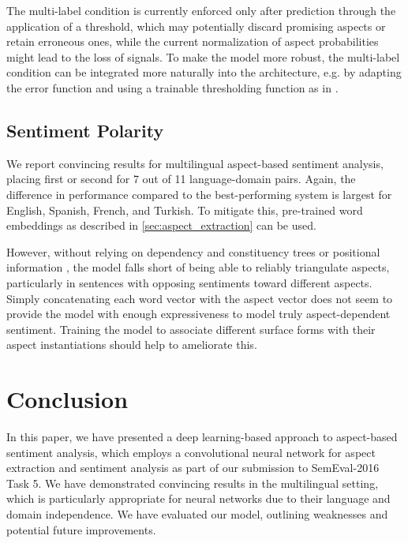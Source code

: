 \documentclass[11pt,letterpaper]{article}
\begin{document}
The multi-label condition is currently enforced only after prediction through the application of a threshold, which may potentially discard promising aspects or retain erroneous ones, while the current normalization of aspect probabilities might lead to the loss of signals. To make the model more robust, the multi-label condition can be integrated more naturally into the architecture, e.g. by adapting the error function and using a trainable thresholding function as in \cite{Zhang2006}.

\subsection{Sentiment Polarity}

We report convincing results for multilingual aspect-based sentiment analysis, placing first or second for 7 out of 11 language-domain pairs. Again, the difference in performance compared to the best-performing system is largest for English, Spanish, French, and Turkish. To mitigate this, pre-trained word embeddings as described in \ref{sec:aspect_extraction} can be used.

However, without relying on dependency and constituency trees \cite{Nguyen2015a} or positional information \cite{Tang2015}, the model falls short of being able to reliably triangulate aspects, particularly in sentences with opposing sentiments toward different aspects. Simply concatenating each word vector with the aspect vector does not seem to provide the model with enough expressiveness to model truly aspect-dependent sentiment. Training the model to associate different surface forms with their aspect instantiations should help to ameliorate this.

\section{Conclusion}

In this paper, we have presented a deep learning-based approach to aspect-based sentiment analysis, which employs a convolutional neural network for aspect extraction and sentiment analysis as part of our submission to SemEval-2016 Task 5. We have demonstrated convincing results in the multilingual setting, which is particularly appropriate for neural networks due to their language and domain independence. We have evaluated our model, outlining weaknesses and potential future improvements.
\end{document}
